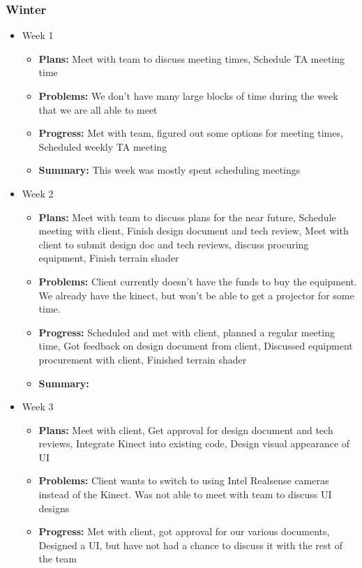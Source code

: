 \documentclass[onecolumn, draftclsnofoot,10pt, compsoc]{IEEEtran}
\begin{document}
\subsubsection{Winter}
\begin{itemize}
\item Week 1
	\begin{itemize}
	\item \textbf{Plans:} Meet with team to discuss meeting times, Schedule TA meeting time
    \item \textbf{Problems:} We don't have many large blocks of time during the week that we are all able to meet
    \item \textbf{Progress:} Met with team, figured out some options for meeting times, Scheduled weekly TA meeting
    \item \textbf{Summary:} This week was mostly spent scheduling meetings
	\end{itemize}
\item Week 2
	\begin{itemize}
	\item \textbf{Plans:} Meet with team to discuss plans for the near future, Schedule meeting with client, Finish design document and tech review, Meet with client to submit design doc and tech reviews, discuss procuring equipment, Finish terrain shader
    \item \textbf{Problems:} Client currently doesn't have the funds to buy the equipment. We already have the kinect, but won't be able to get a projector for some time.
    \item \textbf{Progress:} Scheduled and met with client, planned a regular meeting time, Got feedback on design document from client, Discussed equipment procurement with client, Finished terrain shader
    \item \textbf{Summary:}
	\end{itemize}
\item Week 3
	\begin{itemize}
	\item \textbf{Plans:} Meet with client, Get approval for design document and tech reviews, Integrate Kinect into existing code, Design visual appearance of UI
    \item \textbf{Problems:} Client wants to switch to using Intel Realsense cameras instead of the Kinect. Was not able to meet with team to discuss UI designs
    \item \textbf{Progress:} Met with client, got approval for our various documents, Designed a UI, but have not had a chance to discuss it with the rest of the team

\end{itemize}
\end{itemize}
\end{document}
